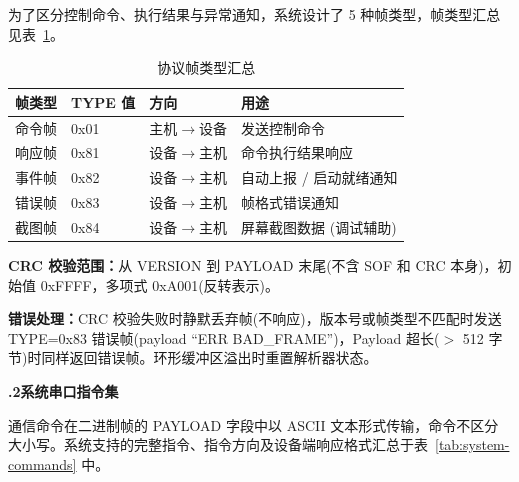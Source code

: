\documentclass[UTF8,a4paper,zihao=-4,fontset=macnew]{ctexart}
\newcommand{\subsubsectiontitle}[2]{%
  \vspace{0.24cm}%
  {\noindent\heiti\bfseries\fontsize{14pt}{16pt}\selectfont #1\quad #2\par}%
  \vspace{0.34cm}%
}
\begin{document}
为了区分控制命令、执行结果与异常通知，系统设计了 5 种帧类型，帧类型汇总见表~\ref{tab:protocol-summary}。

\begin{table}[H]
\centering
{}
\caption{协议帧类型汇总}
\label{tab:protocol-summary}
\begin{tabular}{llll}
\toprule
帧类型 & TYPE 值 & 方向 & 用途 \\
\midrule
命令帧 & 0x01 & 主机$\rightarrow$设备 & 发送控制命令 \\
响应帧 & 0x81 & 设备$\rightarrow$主机 & 命令执行结果响应 \\
事件帧 & 0x82 & 设备$\rightarrow$主机 & 自动上报 / 启动就绪通知 \\
错误帧 & 0x83 & 设备$\rightarrow$主机 & 帧格式错误通知 \\
截图帧 & 0x84 & 设备$\rightarrow$主机 & 屏幕截图数据 (调试辅助) \\
\bottomrule
\end{tabular}
\end{table}

\textbf{CRC 校验范围：}从 VERSION 到 PAYLOAD 末尾(不含 SOF 和 CRC 本身)，初始值 0xFFFF，多项式 0xA001(反转表示)。

\textbf{错误处理：}CRC 校验失败时静默丢弃帧(不响应)，版本号或帧类型不匹配时发送 TYPE=0x83 错误帧(payload ``ERR BAD\_FRAME'')，Payload 超长($>$ 512 字节)时同样返回错误帧。环形缓冲区溢出时重置解析器状态。

\subsubsectiontitle{3.4.2}{系统串口指令集}

通信命令在二进制帧的 PAYLOAD 字段中以 ASCII 文本形式传输，命令不区分大小写。系统支持的完整指令、指令方向及设备端响应格式汇总于表~\ref{tab:system-commands} 中。
\end{document}
